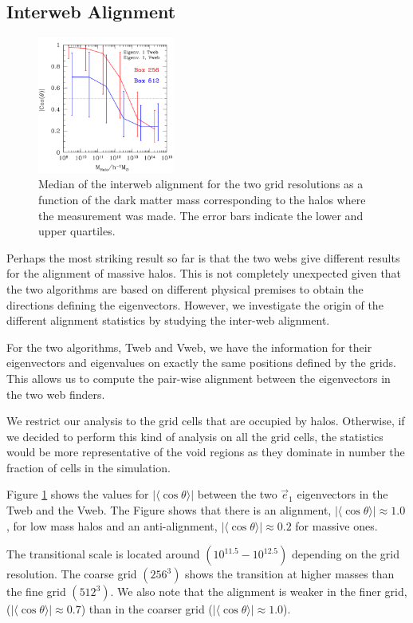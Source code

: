 \documentclass[useAMS,usenatbib]{mn2e}
\newcommand{\hMsun}{{\ifmmode{h^{-1}{\rm
        {M_{\odot}}}}\else{$h^{-1}{\rm{M_{\odot}}}$~}\fi}}
\newcommand{\muavg}{\vert\langle\cos\theta\rangle\vert}
\begin{document}
\subsection{Interweb Alignment}

\begin{figure}
\includegraphics[width=0.40\textwidth]{Fig5.pdf}
\caption{Median of the interweb alignment for the two grid
  resolutions as a function of the dark matter mass corresponding to
  the halos where the measurement was made. The error bars indicate
  the lower and upper quartiles.
\label{fig:interweb}}
\end{figure}

Perhaps the most striking result so far is that the two webs give
different results for the alignment of massive halos. This is not
completely unexpected given that the two algorithms are based on
different physical premises to obtain the directions defining the
eigenvectors. However, we investigate the origin of the different
alignment statistics by studying the inter-web alignment.
 
For the two algorithms, Tweb and Vweb, we have the information for their
eigenvectors and eigenvalues on exactly the same positions defined
by the grids. This allows us to compute the pair-wise alignment
between the eigenvectors in the two web finders.

We restrict our analysis to the grid cells that are occupied by
halos. Otherwise, if we decided to perform this kind of analysis on
all the grid cells, the statistics would be more representative of the void
regions as they dominate in number the fraction of cells in the
simulation.

Figure \ref{fig:interweb} shows the values for $\muavg$ between the
two $\vec{e}_1$ eigenvectors in the Tweb and the Vweb.  The Figure
shows that there is an alignment, $\muavg\approx 1.0$, for low mass
halos and an anti-alignment, $\muavg\approx 0.2$ for massive ones.

The transitional scale is located around $(10^{11.5}-10^{12.5})$\hMsun
depending on the grid resolution. The coarse grid $(256^3)$ shows the
transition at higher masses than the fine grid $(512^3)$.   We also
note that the alignment is weaker in the finer grid, ($\muavg\approx
0.7$) than in the coarser grid ($\muavg\approx1.0$).
\end{document}
